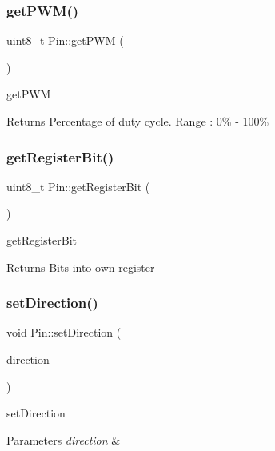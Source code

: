 \subsubsection{\texorpdfstring{get\+P\+W\+M()}{getPWM()}}
{\footnotesize\ttfamily uint8\+\_\+t Pin\+::get\+P\+WM (\begin{DoxyParamCaption}{ }\end{DoxyParamCaption})}



get\+P\+WM 

\begin{DoxyReturn}{Returns}
Percentage of duty cycle. Range \+: 0\% -\/ 100\% 
\end{DoxyReturn}
\mbox{\label{classPin_af7d88df8c24769198ee8e022ce0ed0fd}} 
\subsubsection{\texorpdfstring{get\+Register\+Bit()}{getRegisterBit()}}
{\footnotesize\ttfamily uint8\+\_\+t Pin\+::get\+Register\+Bit (\begin{DoxyParamCaption}{ }\end{DoxyParamCaption})}



get\+Register\+Bit 

\begin{DoxyReturn}{Returns}
Bits into own register 
\end{DoxyReturn}
\mbox{\label{classPin_a49a4bc8df0fad82b4799fa19da708f12}} 
\subsubsection{\texorpdfstring{set\+Direction()}{setDirection()}}
{\footnotesize\ttfamily void Pin\+::set\+Direction (\begin{DoxyParamCaption}\item[{\hyperlink{portmanager_8h_a63d6a5e91a2b1a4156b6c0466f828554}{D\+D\+Rx}}]{direction }\end{DoxyParamCaption})}



set\+Direction 


\begin{DoxyParams}{Parameters}
{\em direction} & \\
\hline
\end{DoxyParams}
\mbox{\label{classPin_a938a229474b8319ced9edbad488d6157}} 
